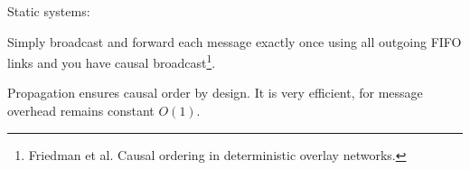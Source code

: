 \documentclass[10pt, xcolor={usenames, dvipsnames}]{beamer}
\newcommand{\cmark}{\ding{51}}
\newcommand{\YES}[1]{\textcolor{green}{#1}}
\begin{document}
\begin{frame}{Static systems: \YES{\cmark}}
  
  \vspace{2em}
  
  Simply broadcast and forward each message exactly once using all outgoing FIFO
  links and you have causal broadcast\footnote{Friedman et al. Causal ordering
    in deterministic overlay networks.}.

  \begin{minipage}{0.32\textwidth}
    \begin{center}
      
    \end{center}
  \end{minipage}
  \begin{minipage}{0.32\textwidth}
    \begin{center}
      
    \end{center}
  \end{minipage}
  \begin{minipage}{0.32\textwidth}
    \begin{center}
      
    \end{center}
  \end{minipage}
  
  \begin{center}
  \begin{minipage}{0.35\textwidth}
    \begin{center}
      
    \end{center}
  \end{minipage}
  \begin{minipage}{0.35\textwidth}
    \begin{center}
      
    \end{center}
  \end{minipage}
  \end{center}

  Propagation ensures causal order by design. It is very efficient, for message
  overhead remains constant $O(1)$.

  \vspace{2em}

\end{frame}
\end{document}
